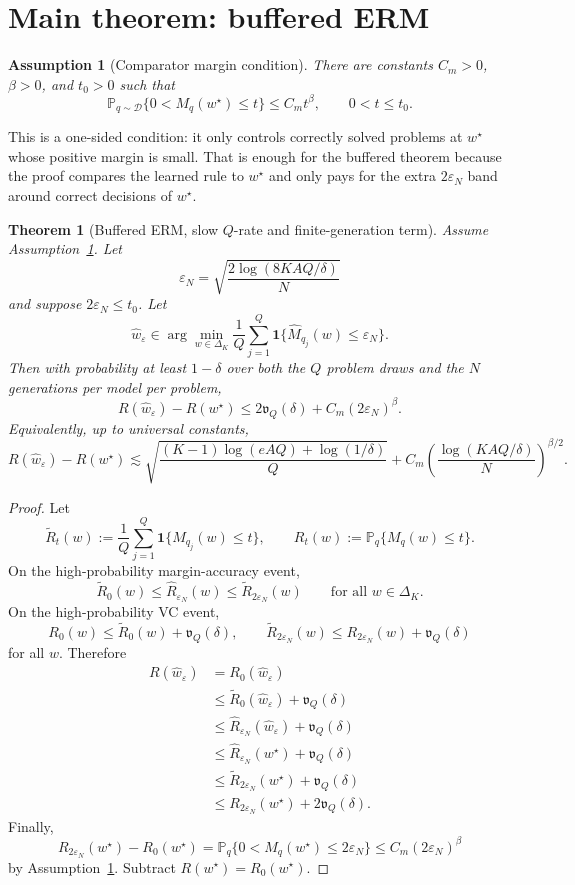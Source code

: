 \documentclass[11pt]{article}
\newtheorem{theorem}{Theorem}
\newtheorem{assumption}{Assumption}
\newcommand{\D}{\mathcal D}
\newcommand{\Pp}{\mathbb P}
\newcommand{\one}{\mathbf 1}
\newcommand{\what}{\widehat w}
\newcommand{\wstar}{w^\star}
\newcommand{\eps}{\varepsilon}
\begin{document}
\section{Main theorem: buffered ERM}

\begin{assumption}[Comparator margin condition]
\label{ass:comp-margin}
There are constants $C_m>0$, $\beta>0$, and $t_0>0$ such that
\[
\Pp_{q\sim\D}\{0<M_q(\wstar)\le t\}
\le
C_m t^\beta,
\qquad 0<t\le t_0.
\]
\end{assumption}

This is a one-sided condition: it only controls correctly solved problems at $\wstar$ whose positive margin is small.  That is enough for the buffered theorem because the proof compares the learned rule to $\wstar$ and only pays for the extra $2\eps_N$ band around correct decisions of $\wstar$.

\begin{theorem}[Buffered ERM, slow $Q$-rate and finite-generation term]
\label{thm:buffered-main}
Assume Assumption~\ref{ass:comp-margin}.  Let
\[
\eps_N=\sqrt{\frac{2\log(8KAQ/\delta)}{N}}
\]
and suppose $2\eps_N\le t_0$.  Let
\[
\what_\eps\in\arg\min_{w\in\Delta_K}
\frac1Q\sum_{j=1}^Q\one\{\widehat M_{q_j}(w)\le\eps_N\}.
\]
Then with probability at least $1-\delta$ over both the $Q$ problem draws and the $N$ generations per model per problem,
\[
R(\what_\eps)-R(\wstar)
\le
2\mathfrak v_Q(\delta)
+
C_m(2\eps_N)^\beta.
\]
Equivalently, up to universal constants,
\[
\boxed{
R(\what_\eps)-R(\wstar)
\lesssim
\sqrt{\frac{(K-1)\log(eAQ)+\log(1/\delta)}{Q}}
+
C_m
\left(\frac{\log(KAQ/\delta)}{N}\right)^{\beta/2}.
}
\]
\end{theorem}

\begin{proof}
Let
\[
\widetilde R_t(w):=\frac1Q\sum_{j=1}^Q\one\{M_{q_j}(w)\le t\},
\qquad
R_t(w):=\Pp_q\{M_q(w)\le t\}.
\]
On the high-probability margin-accuracy event,
\[
\widetilde R_0(w)
\le
\widehat R_{\eps_N}(w)
\le
\widetilde R_{2\eps_N}(w)
\qquad
\text{for all }w\in\Delta_K.
\]
On the high-probability VC event,
\[
R_0(w)\le \widetilde R_0(w)+\mathfrak v_Q(\delta),
\qquad
\widetilde R_{2\eps_N}(w)\le R_{2\eps_N}(w)+\mathfrak v_Q(\delta)
\]
for all $w$.  Therefore
\begin{align*}
R(\what_\eps)
&=R_0(\what_\eps)\\
&\le \widetilde R_0(\what_\eps)+\mathfrak v_Q(\delta)\\
&\le \widehat R_{\eps_N}(\what_\eps)+\mathfrak v_Q(\delta)\\
&\le \widehat R_{\eps_N}(\wstar)+\mathfrak v_Q(\delta)\\
&\le \widetilde R_{2\eps_N}(\wstar)+\mathfrak v_Q(\delta)\\
&\le R_{2\eps_N}(\wstar)+2\mathfrak v_Q(\delta).
\end{align*}
Finally,
\[
R_{2\eps_N}(\wstar)-R_0(\wstar)
=
\Pp_q\{0<M_q(\wstar)\le 2\eps_N\}
\le
C_m(2\eps_N)^\beta
\]
by Assumption~\ref{ass:comp-margin}.  Subtract $R(\wstar)=R_0(\wstar)$.
\end{proof}
\end{document}
